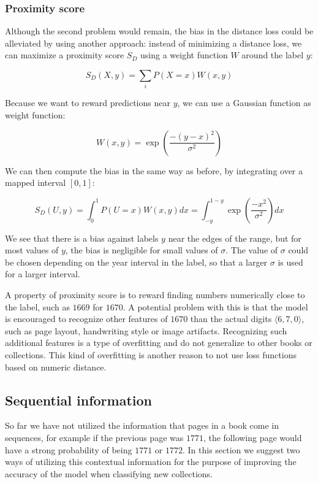 \subsubsection{Proximity score}

Although the second problem would remain, the bias in the distance loss could be alleviated by using another approach:
instead of minimizing a distance loss, we can maximize a proximity score $S_D$ using a weight function $W$ around the label $y$:

\[
S_D(X, y) = \sum_i P(X=x) W(x, y)
\]

Because we want to reward predictions near $y$, we can use a Gaussian function as weight function:

\[
W(x, y) = \exp \left( \frac{-(y-x)^2}{\sigma^2} \right)
\]

We can then compute the bias in the same way as before, by integrating over a mapped interval $[0,1]$:

\[
S_D(U, y) = \int_0^1 P(U=x) W(x, y) dx =
\int_{-y}^{1-y} \exp \left( \frac{-x^2}{\sigma^2} \right) dx
\]

We see that there is a bias against labels $y$ near the edges of the range, but for most values of $y$, the bias is negligible for small values of $\sigma$. The value of $\sigma$ could be chosen depending on the year interval in the label, so that a larger $\sigma$ is used for a larger interval.

A property of proximity score is to reward finding numbers numerically close to the label, such as $1669$ for $1670$. A potential problem with this is that the model is encouraged to recognize other features of $1670$ than the actual digits $\langle 6, 7, 0 \rangle$, such as page layout, handwriting style or image artifacts. Recognizing such additional features is a type of overfitting and do not generalize to other books or collections.
This kind of overfitting is another reason to not use loss functions based on numeric distance.

\subsection{Sequential information}

So far we have not utilized the information that pages in a book come in sequences, for example if the previous page was $1771$, the following page would have a strong probability of being $1771$ or $1772$.
In this section we suggest two ways of utilizing this contextual information for the purpose of improving the accuracy of the model when classifying new collections.

